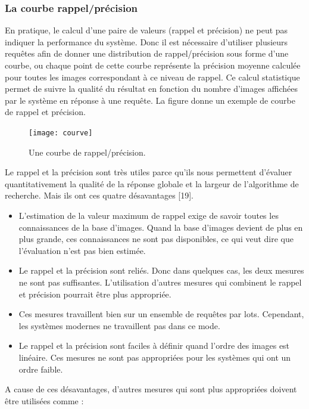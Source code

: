 \subsubsection{La courbe rappel/précision}
En pratique, le calcul d’une paire de valeurs (rappel et précision) ne
peut pas indiquer la performance du système. Donc il est nécessaire
d’utiliser plusieurs requêtes afin de donner une distribution de
rappel/précision sous forme d’une courbe, ou chaque point de cette courbe
représente la précision moyenne calculée pour toutes les images
correspondant à ce niveau de rappel. Ce calcul statistique permet de suivre
la qualité du résultat en fonction du nombre d’images affichées par le
système en réponse à une requête.
La figure donne un exemple de courbe de rappel et précision.
\begin{figure}[H]
	\centering
	\texttt{[image: courve]} 
	\caption{Une courbe de rappel/précision.}
\end{figure}

Le rappel et la précision sont très utiles parce qu’ils nous permettent
d’évaluer quantitativement la qualité de la réponse globale et la largeur de
l’algorithme de recherche. Mais ils ont ces quatre désavantages [19].
\begin{itemize}
	\item L’estimation de la valeur maximum de rappel exige de savoir toutes les connaissances de la base d’images. Quand la base d’images devient de plus en plus grande, ces connaissances ne sont pas disponibles, ce qui veut dire que l’évaluation n’est pas bien estimée.
	\item Le rappel et la précision sont reliés. Donc dans quelques cas, les deux mesures ne sont pas suffisantes. L’utilisation d’autres mesures qui combinent le rappel et précision pourrait être plus appropriée.
	\item Ces mesures travaillent bien sur un ensemble de requêtes par lots. Cependant, les systèmes modernes ne travaillent pas dans ce mode.
	\item Le rappel et la précision sont faciles à définir quand l’ordre des images est linéaire. Ces mesures ne sont pas appropriées pour les systèmes qui ont un ordre faible.
\end{itemize}

A cause de ces désavantages, d’autres mesures qui sont plus appropriées
doivent être utilisées comme :

